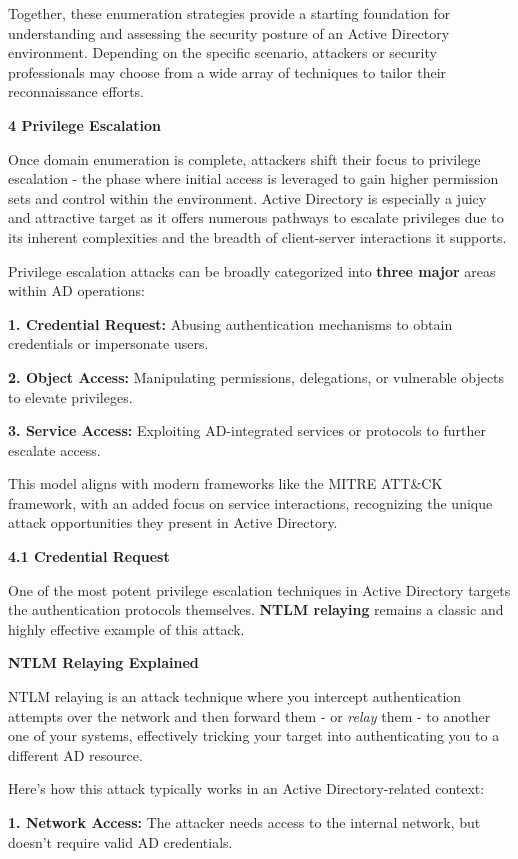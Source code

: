 Together, these enumeration strategies provide a starting foundation for understanding and assessing the security posture of an Active Directory environment. Depending on the specific scenario, attackers or security professionals may choose from a wide array of techniques to tailor their reconnaissance efforts.

\textbf{4 Privilege Escalation}

Once domain enumeration is complete, attackers shift their focus to privilege escalation - the phase where initial access is leveraged to gain higher permission sets and control within the environment. Active Directory is especially a juicy and attractive target as it offers numerous pathways to escalate privileges due to its inherent complexities and the breadth of client-server interactions it supports.

Privilege escalation attacks can be broadly categorized into \textbf{three major }areas within AD operations:

\textbf{1. Credential Request: }Abusing authentication mechanisms to obtain credentials or impersonate users.

\textbf{2. Object Access: }Manipulating permissions, delegations, or vulnerable objects to elevate privileges.

\textbf{3. Service Access: }Exploiting AD-integrated services or protocols to further escalate access.

This model aligns with modern frameworks like the MITRE ATT\&CK framework, with an added focus on service interactions, recognizing the unique attack opportunities they present in Active Directory.

\textbf{4.1 Credential Request}

One of the most potent privilege escalation techniques in Active Directory targets the authentication protocols themselves. \textbf{NTLM relaying }remains a classic and highly effective example of this attack.

\textbf{NTLM Relaying Explained}

NTLM relaying is an attack technique where you intercept authentication attempts over the network and then forward them - or \textit{relay} them - to another one of your systems, effectively tricking your target into authenticating you to a different AD resource.

Here’s how this attack typically works in an Active Directory-related context:

\textbf{1. Network Access: }The attacker needs access to the internal network, but doesn’t require valid AD credentials.

